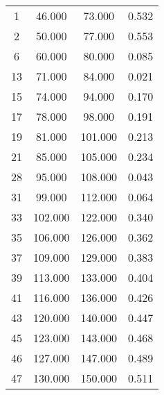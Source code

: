 % 
\begin{tabular}{cccc}
  \hline
  \hline
1 & 46.000 & 73.000 & 0.532 \\ 
  2 & 50.000 & 77.000 & 0.553 \\ 
  6 & 60.000 & 80.000 & 0.085 \\ 
  13 & 71.000 & 84.000 & 0.021 \\ 
  15 & 74.000 & 94.000 & 0.170 \\ 
  17 & 78.000 & 98.000 & 0.191 \\ 
  19 & 81.000 & 101.000 & 0.213 \\ 
  21 & 85.000 & 105.000 & 0.234 \\ 
  28 & 95.000 & 108.000 & 0.043 \\ 
  31 & 99.000 & 112.000 & 0.064 \\ 
  33 & 102.000 & 122.000 & 0.340 \\ 
  35 & 106.000 & 126.000 & 0.362 \\ 
  37 & 109.000 & 129.000 & 0.383 \\ 
  39 & 113.000 & 133.000 & 0.404 \\ 
  41 & 116.000 & 136.000 & 0.426 \\ 
  43 & 120.000 & 140.000 & 0.447 \\ 
  45 & 123.000 & 143.000 & 0.468 \\ 
  46 & 127.000 & 147.000 & 0.489 \\ 
  47 & 130.000 & 150.000 & 0.511 \\ 
   \hline
\end{tabular}
